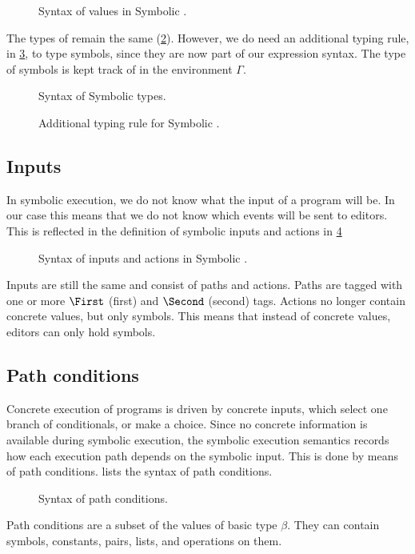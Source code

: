 \begin{figure}[ht]
  \small
  \caption{Syntax of values in Symbolic \TOPHAT.}
  \label{fig:syntaxvalues}
\end{figure}

The types of \TOPHAT remain the same (\cref{fig:syntaxtypes}).
However, we do need an additional typing rule,  in \cref{fig:typingsymbol}, to type symbols,
since they are now part of our expression syntax.
The type of symbols is kept track of in the environment $\Gamma$.

\begin{figure}[t]
  \small
  \caption{Syntax of Symbolic \TOPHAT types.}
  \label{fig:syntaxtypes}
\end{figure}

\begin{figure}[t]
  \small
  \caption{Additional typing rule for Symbolic \TOPHAT.}
  \label{fig:typingsymbol}
\end{figure}



\subsection{Inputs}

In symbolic execution, we do not know what the input of a program will be.
In our case this means that we do not know which events will be sent to editors.
This is reflected in the definition of symbolic inputs and actions in \cref{fig:syntaxinputs}

\begin{figure}[ht]
  \small
  \caption{Syntax of inputs and actions in Symbolic \TOPHAT.}
  \label{fig:syntaxinputs}
\end{figure}

Inputs are still the same and consist of paths and actions.
Paths are tagged with one or more $\First$ (first) and $\Second$ (second) tags.
Actions no longer contain concrete values, but only symbols.
This means that instead of concrete values, editors can only hold symbols.



\subsection{Path conditions}

Concrete execution of \TOPHAT programs is driven by concrete inputs, which select one branch of conditionals, or make a choice.
Since no concrete information is available during symbolic execution, the symbolic execution semantics records how each execution path depends on the symbolic input.
This is done by means of path conditions.
 lists the syntax of path conditions.

\begin{figure}[ht]
  \small
  \caption{Syntax of path conditions.}
  \label{fig:syntaxpredicates}
\end{figure}

Path conditions are a subset of the values of basic type $\beta$.
They can contain symbols, constants, pairs, lists, and operations on them.
